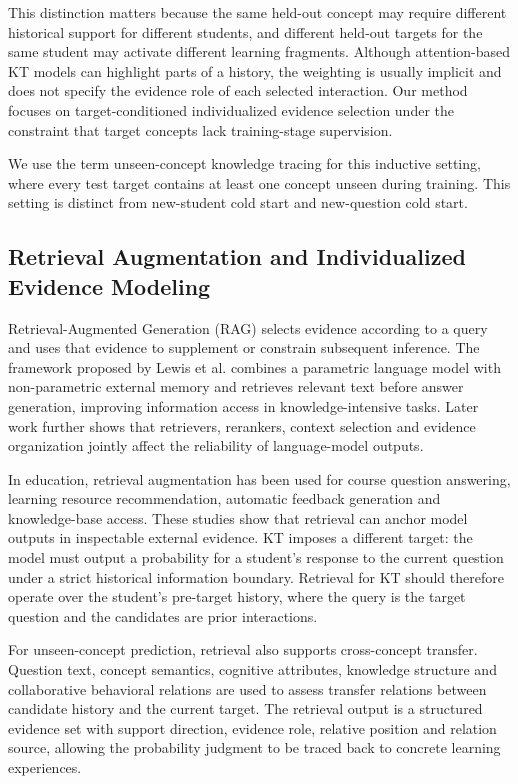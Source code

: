 \documentclass[a4paper,12pt]{article}
\numberwithin{table}{section}
\begin{document}
This distinction matters because the same held-out concept may require different historical support for different students, and different held-out targets for the same student may activate different learning fragments. Although attention-based KT models can highlight parts of a history, the weighting is usually implicit and does not specify the evidence role of each selected interaction. Our method focuses on target-conditioned individualized evidence selection under the constraint that target concepts lack training-stage supervision.

We use the term unseen-concept knowledge tracing for this inductive setting, where every test target contains at least one concept unseen during training. This setting is distinct from new-student cold start and new-question cold start.

\subsection{Retrieval Augmentation and Individualized Evidence Modeling}

Retrieval-Augmented Generation (RAG) selects evidence according to a query and uses that evidence to supplement or constrain subsequent inference. The framework proposed by Lewis et al. combines a parametric language model with non-parametric external memory and retrieves relevant text before answer generation, improving information access in knowledge-intensive tasks\citep{lewis2020rag}. Later work further shows that retrievers, rerankers, context selection and evidence organization jointly affect the reliability of language-model outputs.

In education, retrieval augmentation has been used for course question answering, learning resource recommendation, automatic feedback generation and knowledge-base access\citep{li2025ragedusurvey,swacha2025ragchatbots,dong2023kgrag,zheng2024edukdqa}. These studies show that retrieval can anchor model outputs in inspectable external evidence. KT imposes a different target: the model must output a probability for a student's response to the current question under a strict historical information boundary. Retrieval for KT should therefore operate over the student's pre-target history, where the query is the target question and the candidates are prior interactions.

For unseen-concept prediction, retrieval also supports cross-concept transfer. Question text, concept semantics, cognitive attributes, knowledge structure and collaborative behavioral relations are used to assess transfer relations between candidate history and the current target. The retrieval output is a structured evidence set with support direction, evidence role, relative position and relation source, allowing the probability judgment to be traced back to concrete learning experiences.
\end{document}
